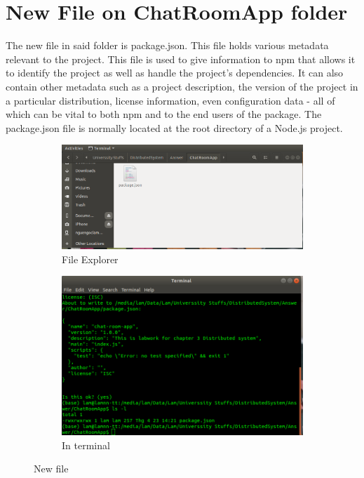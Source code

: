 \documentclass[11pt,a4paper]{report}
\begin{document}
	\section{New File on ChatRoomApp folder}
  	The new file in said folder is package.json. This file holds various metadata relevant to the project. This file is used to give information to npm that allows it to identify the project as well as handle the project's dependencies. It can also contain other metadata such as a project description, the version of the project in a particular distribution, license information, even configuration data - all of which can be vital to both npm and to the end users of the package. The package.json file is normally located at the root directory of a Node.js project.
  	\begin{figure}[h!]
		\centering
  		\begin{subfigure}[b]{0.4\linewidth}
  		\includegraphics[width=\linewidth]{files-expl-chat.png}
    		\caption{File Explorer}
  		\end{subfigure}
  		\begin{subfigure}[b]{0.4\linewidth}
    		\includegraphics[width=\linewidth]{term-chat.png}
    		\caption{In terminal}
  		\end{subfigure}
  		\caption{New file}
  		\label{fig:pack}
	\end{figure}
	
\end{document}
